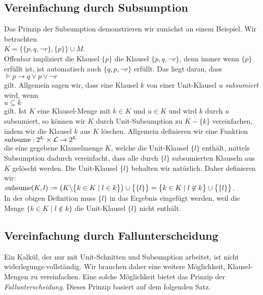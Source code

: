 \subsection{Vereinfachung durch Subsumption}
Das Prinzip der Subsumption demonstrieren wir zun\"{a}chst an einem Beispiel.
Wir betrachten \\[0.2cm]
\hspace*{1.3cm} $K = \bigl\{ \{p, q, \neg r\}, \{p\} \bigr\} \cup M$. \\[0.2cm]
Offenbar impliziert die Klausel $\{p\}$ die Klausel $\{p, q, \neg r\}$, denn immer wenn
$\{p\}$ erf\"{u}llt ist, ist automatisch auch $\{q, p, \neg r\}$ erf\"{u}llt.  Das liegt daran, dass 
\\[0.2cm]
\hspace*{1.3cm} $\models p \rightarrow q \vee p \vee \neg r$
\\[0.2cm]
gilt.  Allgemein sagen wir, dass eine Klausel $k$
 von einer Unit-Klausel $u$ \emph{subsumiert} wird, wenn
\\[0.2cm]
\hspace*{1.3cm} $u \subseteq k$ \\[0.2cm]
gilt.  Ist $K$ eine Klausel-Menge mit $k \in K$ und $u \in K$ und wird
$k$ durch $u$ subsumiert, so k\"{o}nnen wir $K$ durch Unit-Subsumption zu $K - \{k\}$
vereinfachen, indem wir die Klausel $k$ aus $K$ l\"{o}schen.  Allgemein definieren wir eine Funktion
\\[0.2cm]
\hspace*{1.3cm}
$\textsl{subsume}: 2^\mathcal{K} \times \mathcal{L} \rightarrow 2^\mathcal{K}$
\\[0.2cm]
die eine gegebene Klauselmenge $K$, welche die Unit-Klausel $\{l\}$ enth\"{a}lt, mittels Subsumption 
dadurch vereinfacht, dass alle durch $\{l\}$ subsumierten Klauseln aus $K$ gel\"{o}scht werden.
Die Unit-Klausel $\{l\}$ behalten wir nat\"{u}rlich.  Daher definieren wir:
\\[0.2cm]
\hspace*{1.3cm}
$\textsl{subsume}(K, l) := 
\bigl(K \backslash \bigl\{ k \in K \mid l \in k \bigr\}\bigr) \cup \bigl\{\{l\}\bigr\} = 
\bigl\{ k \in K \mid l \not\in k \bigr\} \cup \bigl\{\{l\}\bigr\}$.
\\[0.2cm]
In der obigen Definition muss $\{l\}$ in das Ergebnis eingef\"{u}gt werden, weil die Menge
$\bigl\{ k \in K \mid l \not\in k \bigr\}$ die Unit-Klausel $\{l\}$ nicht enth\"{a}lt.


\subsection{Vereinfachung durch Fallunterscheidung}
Ein Kalk\"{u}l, der nur mit Unit-Schnitten und Subsumption arbeitet, ist nicht 
widerlegungs-vollst\"{a}ndig.  Wir brauchen 
daher eine weitere M\"{o}glichkeit, Klausel-Mengen zu vereinfachen.
Eine solche M\"{o}glichkeit bietet das Prinzip der
\emph{Fallunterscheidung}.  Dieses Prinzip basiert auf dem folgenden
Satz.

